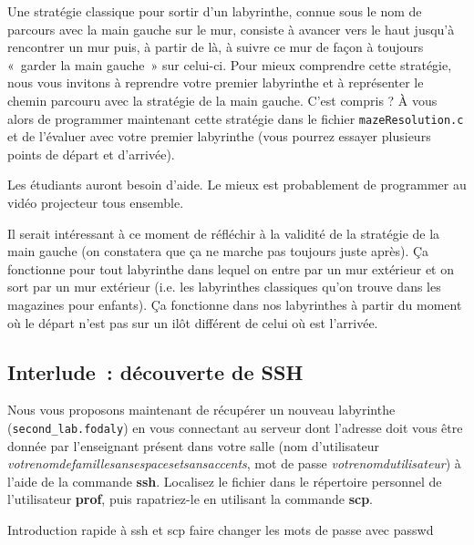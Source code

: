 \documentclass[a4paper]{article}
\newenvironment{enseignants}[1]{\noindent\color{blue}{\bf #1}}{}
\begin{document}
Une stratégie classique pour sortir d’un labyrinthe, connue sous le nom de parcours avec la main gauche sur le mur, consiste à avancer vers le haut jusqu'à rencontrer un mur puis, à partir de là, à suivre ce mur de façon à toujours «~garder la main gauche~» sur celui-ci. %
Pour mieux comprendre cette stratégie, nous vous invitons à reprendre votre premier labyrinthe et à représenter le chemin parcouru avec la stratégie de la main gauche. C’est compris ? \`A vous alors de programmer maintenant cette stratégie dans le fichier \texttt{mazeResolution.c} et de l’évaluer avec votre premier labyrinthe (vous pourrez essayer plusieurs points de départ et d'arrivée).

\begin{enseignants}{De l'aide~:}
Les étudiants auront besoin d'aide. Le mieux est probablement de programmer au vidéo projecteur tous ensemble.
\end{enseignants}

\begin{enseignants}{Réflexion à avoir avec les étudiants une fois l'implantation de la stratégie de la main gauche terminée~:}
Il serait intéressant à ce moment de réfléchir à la validité de la stratégie de la main gauche (on constatera que ça ne marche pas toujours juste après). Ça fonctionne pour tout labyrinthe dans lequel on entre par un mur extérieur et on sort par un mur extérieur (i.e. les labyrinthes classiques qu'on trouve dans les magazines pour enfants). Ça fonctionne dans nos labyrinthes à partir du moment où le départ n'est pas sur un ilôt différent de celui où est l'arrivée.
\end{enseignants}

\subsection{Interlude~: découverte de SSH}

Nous vous proposons maintenant de récupérer un nouveau labyrinthe (\verb|second_lab.fodaly|) en vous connectant au serveur dont l'adresse doit vous être donnée par l'enseignant présent dans votre salle (nom d'utilisateur \textit{votrenomdefamillesansespacesetsansaccents}, mot de passe \textit{votrenomdutilisateur}) à l'aide de la commande \textbf{ssh}.
Localisez le fichier dans le répertoire personnel de l'utilisateur \textbf{prof}, puis rapatriez-le en utilisant la commande \textbf{scp}.

\begin{enseignants}{SSH~:}
  Introduction rapide à ssh et scp
  faire changer les mots de passe avec passwd
\end{enseignants}
\end{document}
